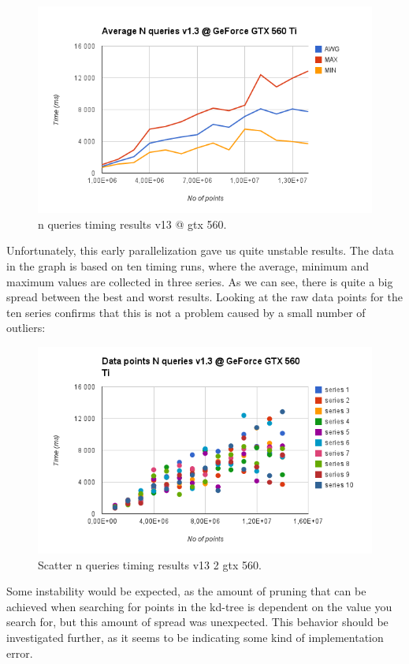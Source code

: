 \begin{enumerate}
\begin{enumerate}
\begin{figure}[ht!]
\centering
\includegraphics[width=120mm]{gfx/n_queries_v13_gtx_560.png}

\caption{n queries timing results v13 @ gtx 560.}
\label{fig:n_queries_v13_gtx_560}
\end{figure}

Unfortunately, this early parallelization gave us quite unstable results. The data in the graph is based on ten timing runs, where the average, minimum and maximum values are collected in three series. As we can see, there is quite a big spread between the best and worst results. Looking at the raw data points for the ten series confirms that this is not a problem caused by a small number of outliers:

\begin{figure}[ht!]
\centering
\includegraphics[width=120mm]{gfx/scatter_n_queries_v13_gtx_560.png}

\caption{Scatter n queries timing results v13 2 gtx 560.}
\label{fig:scatter_n_queries_v13_gtx_560}
\end{figure}

Some instability would be expected, as the amount of pruning that can be achieved when searching for points in the kd-tree is dependent on the value you search for, but this amount of spread was unexpected. This behavior should be investigated further, as it seems to be indicating some kind of implementation error.


\end{enumerate}
\end{enumerate}
